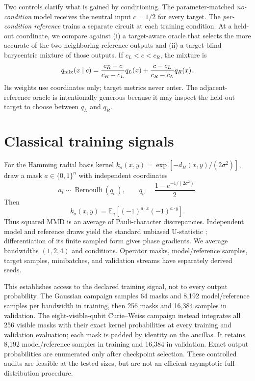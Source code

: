 \documentclass[a4paper,twocolumn,11pt,unpublished]{quantumarticle}
\newcommand{\bits}{\{0,1\}}
\newcommand{\E}{\mathbb{E}}
\begin{document}
Two controls clarify what is gained by conditioning.  The parameter-matched
\emph{no-condition} model receives the neutral input $c=1/2$ for every target.
The \emph{per-condition reference} trains a separate circuit at each training
condition.  At a held-out coordinate, we compare against (i) a
target-aware oracle that selects the more accurate of the two neighboring
reference outputs and (ii) a target-blind barycentric mixture of those
outputs.  If $c_L<c<c_R$, the mixture is
\begin{equation}
 q_{\rm mix}(x\mid c)=\frac{c_R-c}{c_R-c_L}q_L(x)
 +\frac{c-c_L}{c_R-c_L}q_R(x).
 \label{eq:mixture}
\end{equation}
Its weights use coordinates only; target metrics never enter.  The
adjacent-reference oracle is intentionally generous because it may inspect the
held-out target to choose between $q_L$ and $q_R$.

\section{Classical training signals}
\label{sec:signals}

For the Hamming radial basis kernel
$k_\sigma(x,y)=\exp[-d_H(x,y)/(2\sigma^2)]$, draw a mask
$a\in\bits^n$ with independent coordinates
\begin{equation}
 a_i\sim\operatorname{Bernoulli}(q_\sigma),\qquad
 q_\sigma=\frac{1-e^{-1/(2\sigma^2)}}{2}.
 \label{eq:mask-law}
\end{equation}
Then
\begin{equation}
 k_\sigma(x,y)=\E_a[(-1)^{a\cdot x}(-1)^{a\cdot y}].
 \label{eq:character-kernel}
\end{equation}
Thus squared MMD is an average of Pauli-character discrepancies.  Independent
model and reference draws yield the standard unbiased U-statistic
\cite{grettonKernelTwoSample2012}; differentiation of its finite sampled form
gives phase gradients.  We average bandwidths $(1,2,4)$ and conditions.
Operator masks, model/reference samples, target samples, minibatches, and
validation streams have separately derived seeds.

This establishes access to the declared training signal, not to every output
probability.  The Gaussian campaign samples 64 masks and 8,192 model/reference
samples per bandwidth in training, then 256 masks and 16,384 samples in
validation.  The eight-visible-qubit Curie--Weiss campaign instead integrates
all 256 visible masks with their exact kernel probabilities at every training
and validation evaluation; each mask is padded by identity on the ancillas.
It retains 8,192 model/reference samples in training and 16,384 in validation.
Exact output probabilities are enumerated only after checkpoint selection.
These controlled audits are feasible at the tested sizes, but are not an
efficient asymptotic full-distribution procedure.
\end{document}
